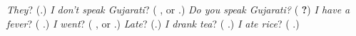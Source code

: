 \begin{tcolorbox}[breakable,colback=teal!4,colframe=teal!35!black,title={Before you move on}]
\emph{They}? (\textbf{}.) \emph{I don't speak Gujarati}? (\textbf{   }, or \textbf{}.) \emph{Do you speak Gujarati?} (\textbf{    ?}) \emph{I have a fever}? (\textbf{  }.) \emph{I went}? (\textbf{ }, or \textbf{}.) \emph{Late}? (\textbf{}.) \emph{I drank tea}? (\textbf{  }.) \emph{I ate rice}? (\textbf{  }.)
\end{tcolorbox}
